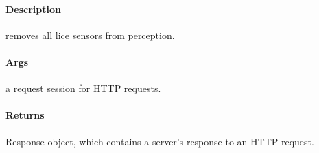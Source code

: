 \documentclass[letterpaper,10pt,english]{sphinxmanual}
\begin{document}
\begin{fulllineitems}
\label{\detokenize{gemini_perception_API:gemini_perception_API.clear_all_lidars}}
\pysigstartsignatures
{}
\pysigstopsignatures

\paragraph{Description}
\label{\detokenize{gemini_perception_API:id5}}
\sphinxAtStartPar
removes all lice sensors from perception.


\paragraph{Args}
\label{\detokenize{gemini_perception_API:id6}}\begin{description}
\sphinxAtStartPar
a request session for HTTP requests.

\end{description}


\paragraph{Returns}
\label{\detokenize{gemini_perception_API:id7}}\begin{description}
\sphinxAtStartPar
Response object, which contains a server’s response to an HTTP request.

\end{description}

\end{fulllineitems}

\end{document}
